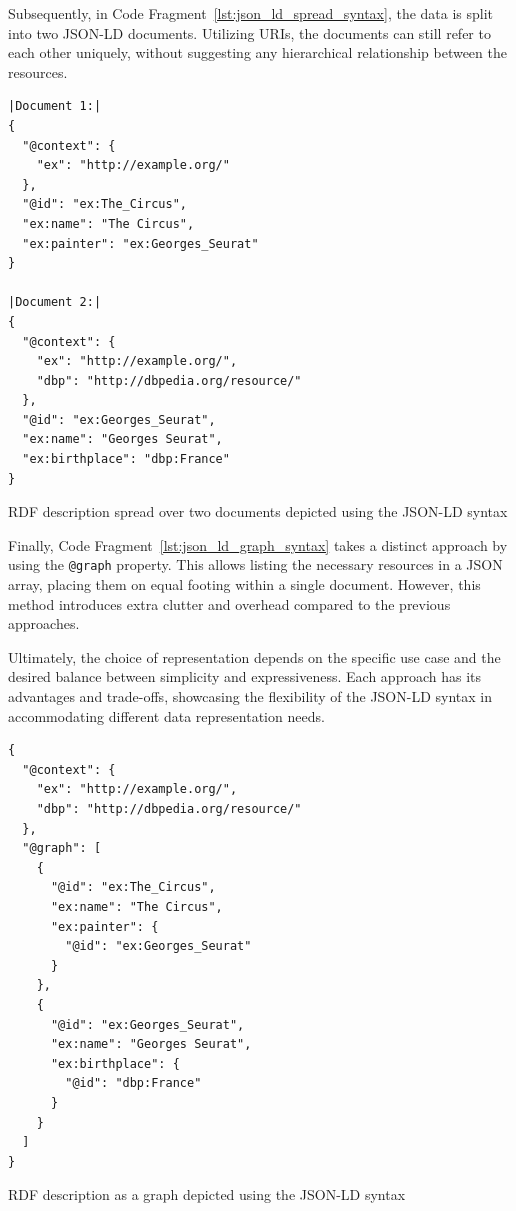 \begin{itemize}
    Subsequently, in Code Fragment~\ref{lst:json_ld_spread_syntax}, the data is split into two JSON-LD documents. Utilizing URIs, the documents can still refer to each other uniquely, without suggesting any hierarchical relationship between the resources.

    \begin{listing}[htbp]
        \begin{verbatim}
|Document 1:|
{
  "@context": {
    "ex": "http://example.org/"
  },
  "@id": "ex:The_Circus",
  "ex:name": "The Circus",
  "ex:painter": "ex:Georges_Seurat"
}

|Document 2:|
{
  "@context": {
    "ex": "http://example.org/",
    "dbp": "http://dbpedia.org/resource/"
  },
  "@id": "ex:Georges_Seurat",
  "ex:name": "Georges Seurat",
  "ex:birthplace": "dbp:France"
}
        \end{verbatim}
        \caption{RDF description spread over two documents depicted using the JSON-LD syntax}
        \label{lst:json_ld_spread_syntax}
    \end{listing}

    Finally, Code Fragment~\ref{lst:json_ld_graph_syntax} takes a distinct approach by using the \texttt{@graph} property. This allows listing the necessary resources in a JSON array, placing them on equal footing within a single document. However, this method introduces extra clutter and overhead compared to the previous approaches. \citep{kellogg2020jsonld}

    Ultimately, the choice of representation depends on the specific use case and the desired balance between simplicity and expressiveness. Each approach has its advantages and trade-offs, showcasing the flexibility of the JSON-LD syntax in accommodating different data representation needs.

    \begin{listing}[htbp]
        \begin{verbatim}
{
  "@context": {
    "ex": "http://example.org/",
    "dbp": "http://dbpedia.org/resource/"
  },
  "@graph": [
    {
      "@id": "ex:The_Circus",
      "ex:name": "The Circus",
      "ex:painter": {
        "@id": "ex:Georges_Seurat"
      }
    },
    {
      "@id": "ex:Georges_Seurat",
      "ex:name": "Georges Seurat",
      "ex:birthplace": {
        "@id": "dbp:France"
      }
    }
  ]
}
        \end{verbatim}
        \caption{RDF description as a graph depicted using the JSON-LD syntax}
        \label{lst:json_ld_graph_syntax}
    \end{listing}


\end{itemize}
